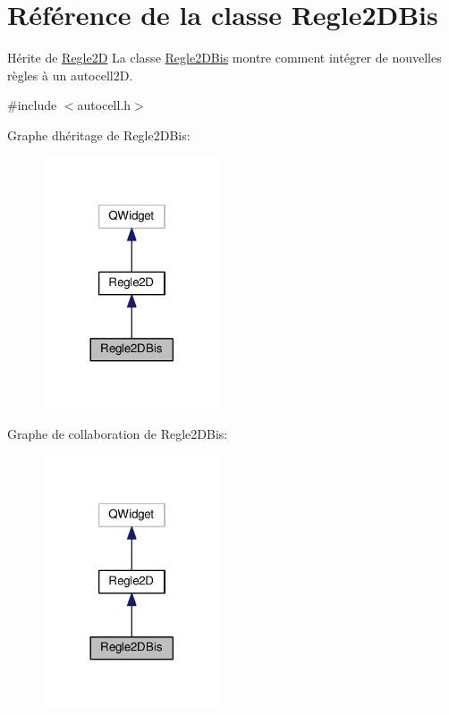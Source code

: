\hypertarget{class_regle2_d_bis}{}\section{Référence de la classe Regle2\+D\+Bis}
\label{class_regle2_d_bis}


Hérite de \hyperlink{class_regle2_d}{Regle2D} La classe \hyperlink{class_regle2_d_bis}{Regle2\+D\+Bis} montre comment intégrer de nouvelles règles à un autocell2D.  




{\ttfamily \#include $<$autocell.\+h$>$}



Graphe d\textquotesingle{}héritage de Regle2\+D\+Bis\+:
\nopagebreak
\begin{figure}[H]
\begin{center}
\leavevmode
\includegraphics[width=149pt]{class_regle2_d_bis__inherit__graph}
\end{center}
\end{figure}


Graphe de collaboration de Regle2\+D\+Bis\+:
\nopagebreak
\begin{figure}[H]
\begin{center}
\leavevmode
\includegraphics[width=149pt]{class_regle2_d_bis__coll__graph}
\end{center}
\end{figure}
